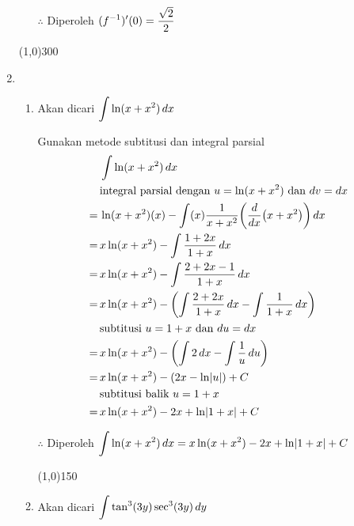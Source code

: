 \begin{enumerate}[leftmargin=*, label={\arabic*}.]
\begin{enumerate}[label={\alph*}.]
    $\therefore$ Diperoleh $\displaystyle (f^{-1})'(0)=\frac{\sqrt{2}}{2}$

    \end{enumerate}

\begin{center}\line(1,0){300}\end{center}


\item 
    \begin{enumerate}[label={\alph*}.]
    \item Akan dicari $\displaystyle\int \ln (x+x^{2})\,dx$
    
    Gunakan metode subtitusi dan integral parsial
    \begin{align*}
        &\int \ln (x+x^{2})\,dx\\
        &\text{integral parsial dengan $u=\ln(x+x^{2})$ dan $dv=dx$}\\
        =\,&\ln(x+x^{2})(x)-\int(x)\frac{1}{x+x^{2}}\brk*{\drv{x}{x+x^{2}}}\,dx\\
        =\,&x\ln(x+x^{2})-\int \frac{1+2x}{1+x}\,dx\\
        =\,&x\ln(x+x^{2})-\int \frac{2+2x-1}{1+x}\,dx\\
        =\,&x\ln(x+x^{2})-\brk*{\int \frac{2+2x}{1+x}\,dx-\int\frac{1}{1+x}\,dx}\\
        &\text{subtitusi $u=1+x$ dan $du=dx$}\\
        =\,&x\ln(x+x^{2})-\brk*{\int 2\,dx-\int\frac{1}{u}\,du}\\
        =\,&x\ln(x+x^{2})-\brk*{2x-\ln\abs{u}}+C\\
        &\text{subtitusi balik $u=1+x$}\\
        =\,&x\ln(x+x^{2})-2x+\ln\abs{1+x}+C\\
    \end{align*}

    $\therefore$ Diperoleh $\displaystyle \int \ln (x+x^{2})\,dx
    =x\ln(x+x^{2})-2x+\ln\lvert1+x\rvert+C$


\begin{center}\line(1,0){150}\end{center}


    \item Akan dicari $\displaystyle\int \tan^{3}(3y)\sec^{3}(3y)\,dy$
    

\end{enumerate}
\end{enumerate}
